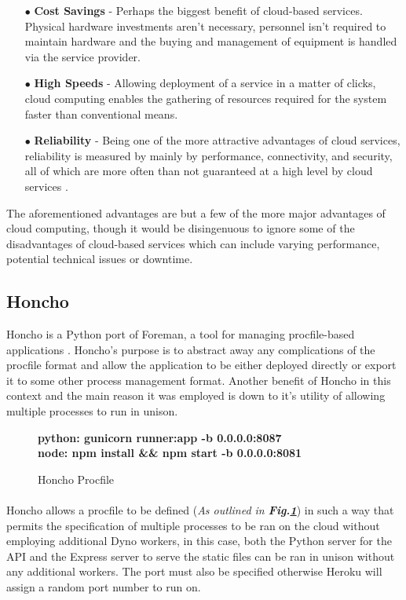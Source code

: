 \begin{enumerate}
    \item[$\bullet$] \textbf{Cost Savings} - Perhaps the biggest benefit of cloud-based services. Physical hardware investments aren't necessary, personnel isn't required to maintain hardware and the buying and management of equipment is handled via the service provider.
    \item[$\bullet$] \textbf{High Speeds} - Allowing deployment of a service in a matter of clicks, cloud computing enables the gathering of resources required for the system faster than conventional means.
    \item[$\bullet$] \textbf{Reliability} - Being one of the more attractive advantages of cloud services, reliability is measured by mainly by performance, connectivity, and security, all of which are more often than not guaranteed at a high level by cloud services .
\end{enumerate}

The aforementioned advantages \cite{CLOUD} are but a few of the more major advantages of cloud computing, though it would be disingenuous to ignore some of the disadvantages of cloud-based services which can include varying performance, potential technical issues or downtime.

\subsection{Honcho}
Honcho is a Python port of Foreman, a tool for managing procfile-based applications \cite{HONCHO}. Honcho's purpose is to abstract away any complications of the procfile format and allow the application to be either deployed directly or export it to some other process management format. Another benefit of Honcho in this context and the main reason it was employed is down to it's utility of allowing multiple processes to run in unison.

\begin{figure}[H]
    \centering
    \textbf{python: gunicorn runner:app -b 0.0.0.0:8087\\ node: npm install \&\& npm start -b 0.0.0.0:8081}
    \caption{Honcho Procfile}
    \label{image:honchoProcfile}
\end{figure}

\paragraph{}
Honcho allows a procfile to be defined (\textit{As outlined in \textbf{Fig.\ref{image:honchoProcfile}}}) in such a way that permits the specification of multiple processes to be ran on the cloud without employing additional Dyno workers, in this case, both the Python server for the API and the Express server to serve the static files can be ran in unison without any additional workers. The port must also be specified otherwise Heroku will assign a random port number to run on.

